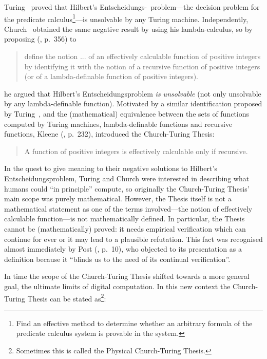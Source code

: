 \documentclass{comjnl}
\begin{document}
Turing~\cite{turing-36} proved that Hilbert's Entscheidungs-\ problem---the decision problem for the predicate calculus\footnote{Find an effective method to determine whether an arbitrary formula    of the predicate calculus system is provable in the system.}---is unsolvable by any Turing machine. Independently, Church~\cite{church30} obtained the same negative result by using his lambda-calculus, so by proposing (\cite{church30}, p.\ 356) to

\begin{quote}
define the notion ... of an effectively calculable function of positive integers by identifying it with the notion of a recursive function of positive integers (or of a lambda-definable function of positive integers).
\end{quote}
he argued that Hilbert's Entscheidungsproblem {\em is unsolvable} (not only unsolvable by any lambda-definable function). Motivated by a similar  identification  proposed by Turing~\cite{turing-36}, and the (mathematical) equivalence between the
sets of functions computed by Turing machines,  lambda-definable functions and recursive functions,  Kleene (\cite{kleene-52}, p.\ 232),  introduced the
Church-Turing Thesis:

\begin{quote}
A function of positive integers is effectively calculable only if recursive.
\end{quote}

  In the quest to give meaning to their negative solutions to Hilbert's Entscheidungsproblem,  Turing and Church were interested in describing what humans could ``in principle'' compute, so originally the Church-Turing Thesis' main scope was purely mathematical. However, the Thesis itself is  not a mathematical statement as one of the terms involved---the notion of  effectively calculable function---is
not mathematically defined. In particular,  the Thesis cannot be (mathematically) proved: it needs empirical verification which can continue for ever or it may lead to a plausible refutation. This fact was recognised almost immediately by
Post (\cite{post-1936}, p.\ 10), who  objected to its presentation as a definition because it ``blinds us to the need of its continual verification''.

In time the scope of the  Church-Turing Thesis shifted towards a more general goal, the ultimate limits of digital computation. In this  new context the  Church-Turing Thesis can be stated as\footnote{Sometimes this is called the Physical Church-Turing Thesis.}:
\end{document}
